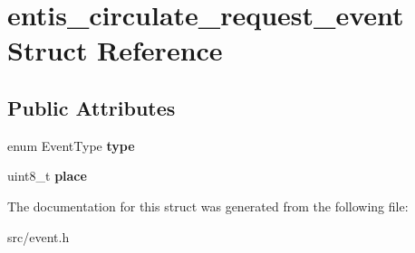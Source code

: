 \hypertarget{structentis__circulate__request__event}{}\section{entis\+\_\+circulate\+\_\+request\+\_\+event Struct Reference}
\label{structentis__circulate__request__event}
\subsection*{Public Attributes}
\begin{DoxyCompactItemize}
\item 
\mbox{\label{structentis__circulate__request__event_a5f8cf7c548a4fbb33bf2a535e708cd18}} 
enum Event\+Type {\bfseries type}
\item 
\mbox{\label{structentis__circulate__request__event_ac1f66dff608ebfbb8a4210c9e50946b1}} 
uint8\+\_\+t {\bfseries place}
\end{DoxyCompactItemize}


The documentation for this struct was generated from the following file\+:\begin{DoxyCompactItemize}
\item 
src/event.\+h\end{DoxyCompactItemize}
